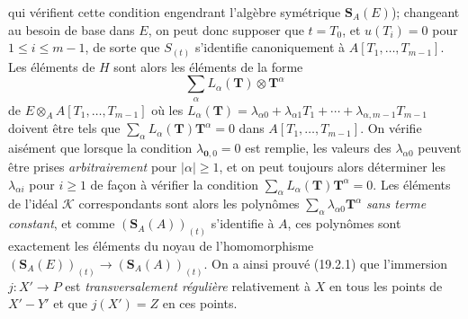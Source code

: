 
qui vérifient cette condition engendrant l'algèbre symétrique $\mathbf S_A(E)$); changeant au besoin de base dans $E$, on peut donc supposer que $t=T_0$, et $u(T_i)=0$ pour $1\leq i\leq m-1$, de sorte que $S_{(t)}$ s'identifie canoniquement à $A[T_1,\ldots,T_{m-1}]$. Les éléments de $H$ sont alors les éléments de la forme
\[
  \sum_\alpha L_\alpha(\mathbf T)\otimes\mathbf T^\alpha
\]
de $E\otimes_A A[T_1,\ldots,T_{m-1}]$ où les $L_\alpha(\mathbf T)=\lambda_{\alpha0}+\lambda_{\alpha1}T_1+\cdots+\lambda_{\alpha,m-1}T_{m-1}$ doivent être tels que $\sum_\alpha L_\alpha(\mathbf T)\mathbf T^\alpha=0$ dans $A[T_1,\ldots,T_{m-1}]$. On vérifie aisément que lorsque la condition $\lambda_{\mathbf0,0}=0$ est remplie, les valeurs des $\lambda_{\alpha0}$ peuvent être prises \emph{arbitrairement} pour $|\alpha|\geq1$, et on peut toujours alors déterminer les $\lambda_{\alpha i}$ pour $i\geq1$ de façon à vérifier la condition $\sum_\alpha L_\alpha(\mathbf T)\mathbf T^\alpha=0$. Les éléments de l'idéal $\mathscr K$ correspondants sont alors les polynômes $\sum_\alpha\lambda_{\alpha0}\mathbf T^\alpha$ \emph{sans terme constant}, et comme $(\mathbf S_A(A))_{(t)}$ s'identifie à $A$, ces polynômes sont exactement les éléments du noyau de l'homomorphisme $(\mathbf S_A(E))_{(t)}\to(\mathbf S_A(A))_{(t)}$. On a ainsi prouvé (19.2.1) que l'immersion $j:X'\to P$ est \emph{transversalement régulière} relativement à $X$ en tous les points de $X'-Y'$ et que $j(X')=Z$ en ces points.

